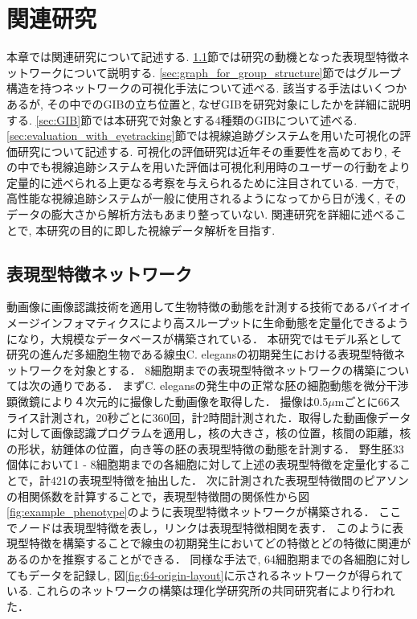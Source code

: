 \documentclass{kuee}
\begin{document}
\chapter{関連研究}
\label{chap:relatedwork}
本章では関連研究について記述する.
\ref{sec:vis_bio}節では研究の動機となった表現型特徴ネットワークについて説明する.
\ref{sec:graph_for_group_structure}節ではグループ構造を持つネットワークの可視化手法について述べる.
該当する手法はいくつかあるが, その中でのGIBの立ち位置と, なぜGIBを研究対象にしたかを詳細に説明する.
\ref{sec:GIB}節では本研究で対象とする4種類のGIBについて述べる.
\ref{sec:evaluation_with_eyetracking}節では視線追跡グシステムを用いた可視化の評価研究について記述する.
可視化の評価研究は近年その重要性を高めており, その中でも視線追跡システムを用いた評価は可視化利用時のユーザーの行動をより定量的に述べられる上更なる考察を与えられるために注目されている.
一方で, 高性能な視線追跡システムが一般に使用されるようになってから日が浅く, そのデータの膨大さから解析方法もあまり整っていない.
関連研究を詳細に述べることで, 本研究の目的に即した視線データ解析を目指す.

\section{表現型特徴ネットワーク}
\label{sec:vis_bio}
動画像に画像認識技術を適用して生物特徴の動態を計測する技術であるバイオイメージインフォマティクスにより高スループットに生命動態を定量化できるようになり，大規模なデータベースが構築されている．
本研究ではモデル系として研究の進んだ多細胞生物である線虫C. elegansの初期発生における表現型特徴ネットワークを対象とする．
8細胞期までの表現型特徴ネットワークの構築については次の通りである．
まずC. elegansの発生中の正常な胚の細胞動態を微分干渉顕微鏡により４次元的に撮像した動画像を取得した．
撮像は0.5$\mu$mごとに66スライス計測され，20秒ごとに360回，計2時間計測された．取得した動画像データに対して画像認識プログラムを適用し，核の大きさ，核の位置，核間の距離，核の形状，紡錘体の位置，向き等の胚の表現型特徴の動態を計測する．
野生胚33個体において1 - 8細胞期までの各細胞に対して上述の表現型特徴を定量化することで，計421の表現型特徴を抽出した．
次に計測された表現型特徴間のピアソンの相関係数を計算することで，表現型特徴間の関係性から図\ref{fig:example_phenotype}のように表現型特徴ネットワークが構築される．
ここでノードは表現型特徴を表し，リンクは表現型特徴相関を表す．
このように表現型特徴を構築することで線虫の初期発生においてどの特徴とどの特徴に関連があるのかを推察することができる．
同様な手法で, 64細胞期までの各細胞に対してもデータを記録し, 図\ref{fig:64-origin-layout}に示されるネットワークが得られている.
これらのネットワークの構築は理化学研究所の共同研究者により行われた．
\end{document}
